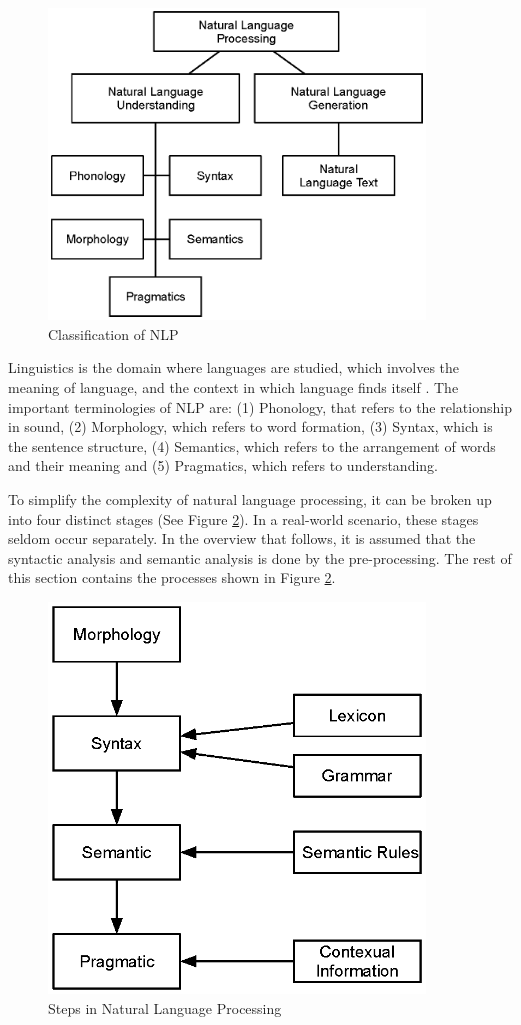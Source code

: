 \begin{figure}[htbp]
\centering
\includegraphics[width=10cm]{./figures/NLP3.eps}
\caption{Classification of NLP}
\label{fig:CNLP}
\end{figure}

Linguistics is the domain where languages are studied, which involves
the meaning of language, and the context in which language finds itself \cite{Bates9977}. The important terminologies of NLP are: (1) Phonology, that refers to the relationship in sound, (2) Morphology, which refers to word formation, (3) Syntax, which is the sentence structure, (4) Semantics, which refers to the arrangement of words and their meaning \cite{hassan2021natural} and (5) Pragmatics, which refers to understanding.

To simplify the complexity of natural language processing, it can be broken up into four distinct stages (See Figure \ref{fig:stepsnlp}). In a real-world scenario, these stages seldom occur separately. In the overview that follows, it is assumed that the syntactic analysis and semantic analysis is done by the pre-processing.
The rest of this section contains the processes shown in Figure \ref{fig:stepsnlp}.

\begin{figure}[htbp]
\centering
\includegraphics[width=10cm]{./figures/NLPstep.eps}
\caption{Steps in Natural Language Processing}
\label{fig:stepsnlp}
\end{figure}
